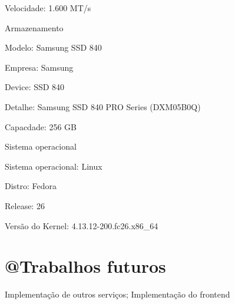 \begin{alineas}
\begin{alineas}
     \item Velocidade: 1.600 MT/s

  \end{alineas}

  \item Armazenamento

  \begin{alineas}

     \item Modelo: Samsung SSD 840

     \item Empresa: Samsung

     \item Device: SSD 840

     \item Detalhe: Samsung SSD 840 PRO Series (DXM05B0Q)

     \item Capacdade: 256 GB

  \end{alineas}

  \item Sistema operacional

  \begin{alineas}

     \item Sistema operacional: Linux

     \item Distro: Fedora

     \item Release: 26

     \item Versão do Kernel: 4.13.12-200.fc26.x86\_64

  \end{alineas}

\end{alineas}

\section{@Trabalhos futuros}\label{trabalhos-futuros}

Implementação de outros serviços; Implementação do frontend
